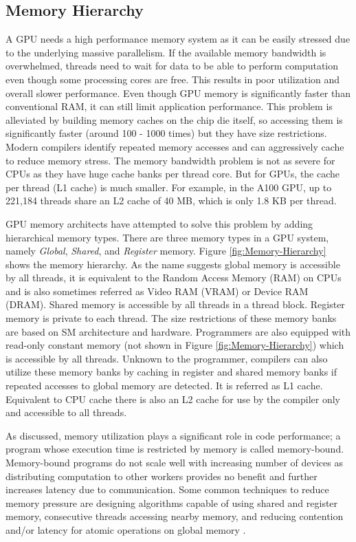\subsection{Memory Hierarchy}
A GPU needs a high performance memory system as it can be easily stressed due to the underlying massive parallelism.
If the available memory bandwidth is overwhelmed, threads need to wait for data to be able to perform computation even though some processing cores are free. This results in poor utilization and overall slower performance.
Even though GPU memory is significantly faster than conventional RAM, it can still limit application performance.
This problem is alleviated by building memory caches on the chip die itself, so accessing them is significantly faster (around 100 - 1000 times) but they have size restrictions.
Modern compilers identify repeated memory accesses and can aggressively cache to reduce memory stress.
The memory bandwidth problem is not as severe for CPUs as they have huge cache banks per thread core. But for GPUs, the cache per thread (L1 cache) is much smaller.
For example, in the A100 GPU, up to 221,184 threads share an L2 cache of 40 MB, which is only 1.8 KB per thread.

GPU memory architects have attempted to solve this problem by adding hierarchical memory types.
There are three memory types in a GPU system, namely \textit{Global}, \textit{Shared}, and \textit{Register} memory.
Figure \ref{fig:Memory-Hierarchy} shows the memory hierarchy. As the name suggests global memory is accessible by all threads, it is equivalent to the Random Access Memory (RAM) on CPUs and is also sometimes referred as Video RAM (VRAM) or Device RAM (DRAM).
Shared memory is accessible by all threads in a thread block.
Register memory is private to each thread.
The size restrictions of these memory banks are based on SM architecture and hardware.
Programmers are also equipped with read-only constant memory (not shown in Figure \ref{fig:Memory-Hierarchy}) which is accessible by all threads.
Unknown to the programmer, compilers can also utilize these memory banks by caching in register and shared memory banks if repeated accesses to global memory are detected. It is referred as L1 cache. Equivalent to CPU cache there is also an L2 cache for use by the compiler only and accessible to all threads.

As discussed, memory utilization plays a significant role in code performance; a program whose execution time is restricted by memory is called memory-bound. Memory-bound programs do not scale well with increasing number of devices as distributing computation to other workers provides no benefit and further increases latency due to communication.
Some common techniques to reduce memory pressure are designing algorithms capable of using shared and register memory, consecutive threads accessing nearby memory, and reducing contention and/or latency for atomic operations on global memory \cite{GPU_book_wen-mei}.



